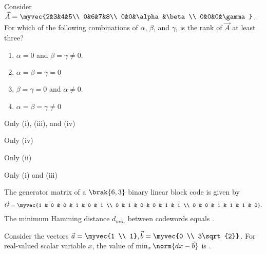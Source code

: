 \item Consider 
$ \vec{A}=\myvec{2&3&4&5\\ 0&6&7&8\\ 0&0&\alpha&\beta\\ 0&0&0&\gamma}$. 
For which of the following combinations of $\alpha$, $\beta$, and $\gamma$, is the rank of $\vec{A}$ at least three? 
\hfill{}
\begin{multicols}{2}
\begin{enumerate}[label=(\roman*)]
    \item $\alpha=0$ and $\beta=\gamma\ne0$.
    \item $\alpha=\beta=\gamma=0$
    \item $\beta=\gamma=0$ and $\alpha\ne0$.
    \item $\alpha=\beta=\gamma\ne0$
\end{enumerate}
\end{multicols}
\begin{enumerate}
\begin{multicols}{2}
\item Only (i), (iii), and (iv)
\item Only (iv)
\item Only (ii)
\item Only (i) and (iii)
\end{multicols}
\end{enumerate}
\item The generator matrix of a $\brak{6,3}$ binary linear block code is given by
\begin{align*}
    \vec{G} = \myvec{1 & 0 & 0 & 1 & 0 & 1 \\ 0 & 1 & 0 & 0 & 1 & 1 \\ 0 & 0 & 1 & 1 & 1 & 0}.
\end{align*} 
The minimum Hamming distance $d_{min}$ between codewords equals \underline{\hspace{1cm}}.
\hfill{}
\item Consider the vectors
$\vec{a} = \myvec{1 \\ 1}, \vec{b} = \myvec{0 \\ 3\sqrt{2}}$.
For real-valued scalar variable $x$, the value of
$\min_{x} \norm{\vec{a}x - \vec{b}}$
is \underline{\hspace{1cm}}.
\hfill{}

